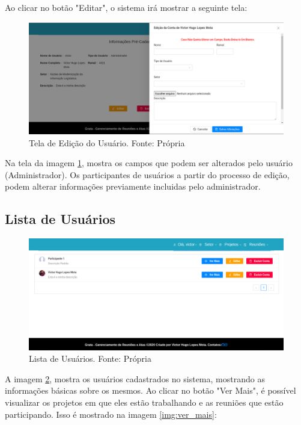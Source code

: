 Ao clicar no botão "Editar", o sistema irá mostrar a seguinte tela:

\begin{figure}[H]
    \centering
    \includegraphics[width=1.0\textwidth]{figuras/edicao_usuario.png}
    \caption{Tela de Edição do Usuário. Fonte: Própria}
    \label{img:tela_edicao_usuario}
\end{figure}

Na tela da imagem \ref{img:tela_edicao_usuario}, mostra os campos que podem ser alterados pelo usuário (Administrador). Os participantes de usuários a partir do processo de edição, podem alterar informações previamente incluidas pelo administrador.

\subsection{Lista de Usuários}

\begin{figure}[H]
    \centering
    \includegraphics[width=1.0\textwidth]{figuras/lista_de_usuarios.png}
    \caption{Lista de Usuários. Fonte: Própria}
    \label{img:lista_de_usuarios}
\end{figure}

A imagem \ref{img:lista_de_usuarios}, mostra os usuários cadastrados no sistema, mostrando as informações básicas sobre os mesmos. Ao clicar no botão "Ver Mais", é possível visualizar os projetos em que eles estão trabalhando e as reuniões que estão participando. Isso é mostrado na imagem \ref{img:ver_mais}:

